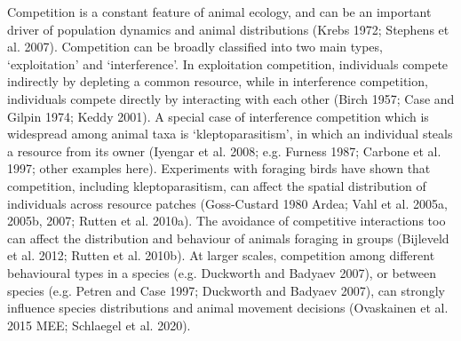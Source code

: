 \documentclass[11pt]{article}
\begin{document}
Competition is a constant feature of animal ecology, and can be an important driver of population dynamics and animal distributions (Krebs 1972; Stephens et al. 2007).
Competition can be broadly classified into two main types, `exploitation' and `interference'. 
In exploitation competition, individuals compete indirectly by depleting a common resource, while in interference competition, individuals compete directly by interacting with each other (Birch 1957; Case and Gilpin 1974; Keddy 2001).
A special case of interference competition which is widespread among animal taxa is `kleptoparasitism', in which an individual steals a resource from its owner (Iyengar et al. 2008; e.g. Furness 1987; Carbone et al. 1997; other examples here).
Experiments with foraging birds have shown that competition, including kleptoparasitism, can affect the spatial distribution of individuals across resource patches (Goss-Custard 1980 Ardea; Vahl et al. 2005a, 2005b, 2007; Rutten et al. 2010a).
The avoidance of competitive interactions too can affect the distribution and behaviour of animals foraging in groups (Bijleveld et al. 2012; Rutten et al. 2010b).
At larger scales, competition among different behavioural types in a species (e.g. Duckworth and Badyaev 2007), or between species (e.g. Petren and Case 1997; Duckworth and Badyaev 2007), can strongly influence species distributions and animal movement decisions (Ovaskainen et al. 2015 MEE; Schlaegel et al. 2020).
\end{document}

